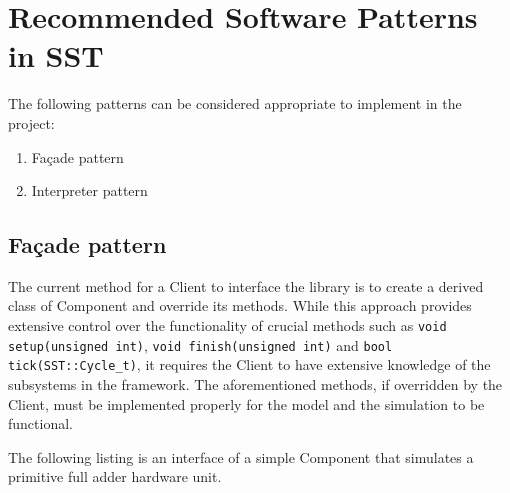 
\section{Recommended Software Patterns in SST}
The following patterns can be considered appropriate to implement in the project:
\begin{enumerate}
    \item Façade pattern
    \item Interpreter pattern
\end{enumerate}

\subsection{Façade pattern}
The current method for a Client to interface the library is to create a derived class of Component and override its methods. While this approach provides extensive control over the functionality of crucial methods such as \texttt{void setup(unsigned int)}, \texttt{void finish(unsigned int)} and \texttt{bool tick(SST::Cycle\_t)}, it requires the Client to have extensive knowledge of the subsystems in the framework. The aforementioned methods, if overridden by the Client, must be implemented properly for the model and the simulation to be functional.

The following listing is an interface of a simple Component that simulates a primitive full adder hardware unit.

